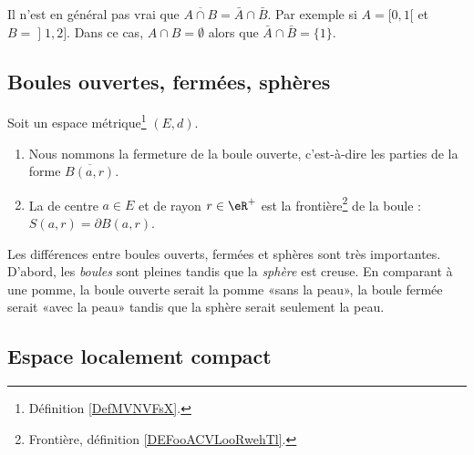 \begin{example} \label{ExBFLooUNyvbw}
	Il n'est en général pas vrai que \( \overline{ A\cap B }=\bar A\cap \bar B\). Par exemple si \( A=\mathopen[ 0 , 1 [\) et \( B=\mathopen] 1 , 2 \mathclose]\). Dans ce cas, \( A\cap B=\emptyset\) alors que \( \bar A\cap\bar B=\{ 1 \}\).
\end{example}

\subsection{Boules ouvertes, fermées, sphères}

\begin{definition}      \label{DEFooPDSJooFcUqKH}
	Soit un espace métrique\footnote{Définition \ref{DefMVNVFsX}.} \( (E,d)\).
	\begin{enumerate}
		\item
		      Nous nommons  la fermeture de la boule ouverte, c'est-à-dire les parties de la forme \( \overline{ B(a,r) }\).
		\item
		      La  de centre \( a\in E\) et de rayon \( r\in \eR^+\) est la frontière\footnote{Frontière, définition \ref{DEFooACVLooRwehTl}.} de la boule : \( S(a,r)=\partial B(a,r)\).
	\end{enumerate}
\end{definition}

\begin{normaltext}
	Les différences entre boules ouverts, fermées et sphères sont très importantes. D'abord, les \emph{boules} sont pleines tandis que la \emph{sphère} est creuse. En comparant à une pomme, la boule ouverte serait la pomme «sans la peau», la boule fermée serait «avec la peau» tandis que la sphère serait seulement la peau.
\end{normaltext}


\subsection{Espace localement compact}

